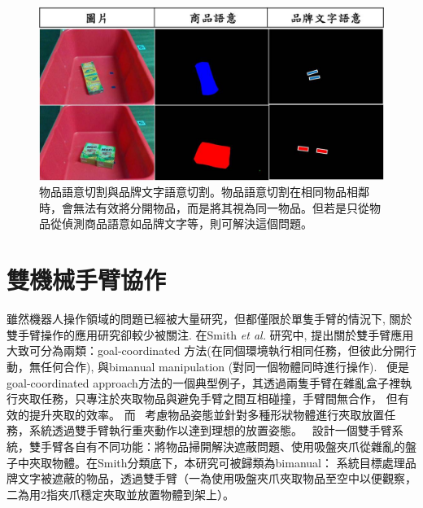 \begin{figure}[H]
	\centering
	\includegraphics[height=!, width=1.0\linewidth, keepaspectratio=true]
	{./figures/product_vs_bn.jpg}
  \caption{物品語意切割與品牌文字語意切割。物品語意切割在相同物品相鄰時，會無法有效將分開物品，而是將其視為同一物品。但若是只從物品從偵測商品語意如品牌文字等，則可解決這個問題。}
  \label{figure:product_vs_bn}
\end{figure}

\section{雙機械手臂協作}
雖然機器人操作領域的問題已經被大量研究，但都僅限於單隻手臂的情況下, 關於雙手臂操作的應用研究卻較少被關注. 在Smith \textit{et al.} \cite{smith2012dual}研究中,
提出關於雙手臂應用大致可分為兩類：goal-coordinated 方法(在同個環境執行相同任務，但彼此分開行動，無任何合作), 與bimanual manipulation (對同一個物體同時進行操作).
~\cite{schwarz2018fast}便是goal-coordinated approach方法的一個典型例子，其透過兩隻手臂在雜亂盒子裡執行夾取任務，只專注於夾取物品與避免手臂之間互相碰撞，手臂間無合作，
但有效的提升夾取的效率。 而~\cite{harada2012pick} 考慮物品姿態並針對多種形狀物體進行夾取放置任務，系統透過雙手臂執行重夾動作以達到理想的放置姿態。
~\cite{miyazaki2017object}設計一個雙手臂系統，雙手臂各自有不同功能：將物品掃開解決遮蔽問題、使用吸盤夾爪從雜亂的盤子中夾取物體。在Smith分類底下，本研究可被歸類為bimanual： 系統目標處理品牌文字被遮蔽的物品，透過雙手臂（一為使用吸盤夾爪夾取物品至空中以便觀察，二為用2指夾爪穩定夾取並放置物體到架上）。

